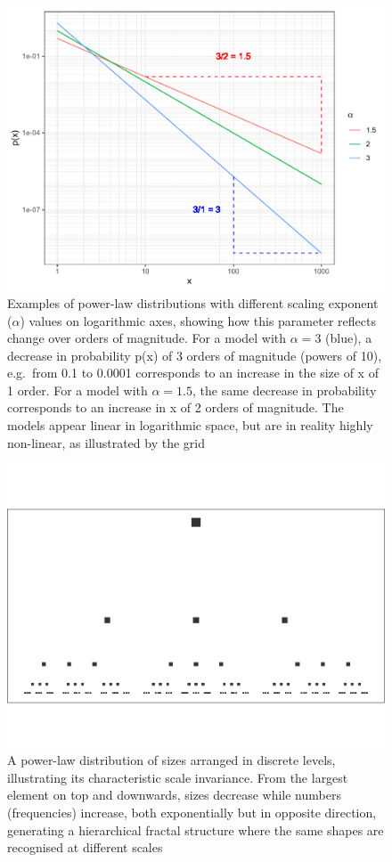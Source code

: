 \documentclass[
  12pt,
]{book}
\begin{document}
\begin{figure}

{\centering \includegraphics[width=0.7\linewidth]{bookdown-demo_files/figure-latex/04-pl-1} 

}

\caption{Examples of power-law distributions with different scaling exponent (\(\alpha\)) values on logarithmic axes, showing how this parameter reflects change over orders of magnitude. For a model with \(\alpha = 3\) (blue), a decrease in probability p(x) of 3 orders of magnitude (powers of 10), e.g.~from 0.1 to 0.0001 corresponds to an increase in the size of x of 1 order. For a model with \(\alpha = 1.5\), the same decrease in probability corresponds to an increase in x of 2 orders of magnitude. The models appear linear in logarithmic space, but are in reality highly non-linear, as illustrated by the grid}\label{fig:04-pl}
\end{figure}



\begin{figure}

{\centering \includegraphics[width=0.7\linewidth]{bookdown-demo_files/figure-latex/04-hierarchy-1} 

}

\caption{A power-law distribution of sizes arranged in discrete levels, illustrating its characteristic scale invariance. From the largest element on top and downwards, sizes decrease while numbers (frequencies) increase, both exponentially but in opposite direction, generating a hierarchical fractal structure where the same shapes are recognised at different scales}\label{fig:04-hierarchy}
\end{figure}
\end{document}
